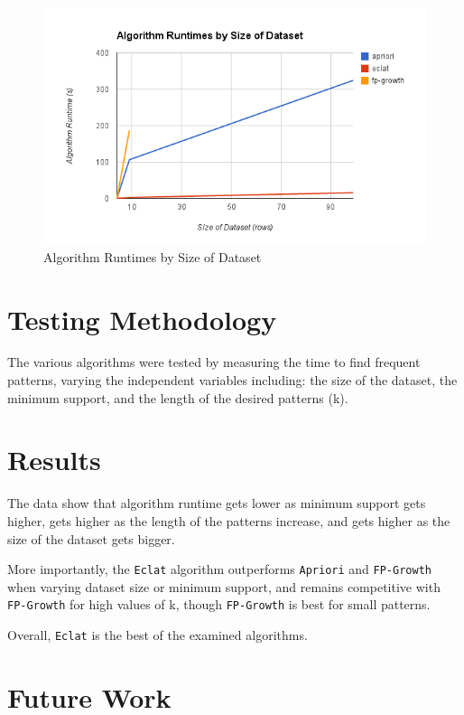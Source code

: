 \documentclass[11pt]{article}
\begin{document}
\begin{multicols}{2}
\begin{center}
\begin{figure}
\includegraphics[scale=0.9]{../figs/runtimes_by_rows.png}
\caption{Algorithm Runtimes by Size of Dataset}
\end{figure}
\end{center}

\section{Testing Methodology}

The various algorithms were tested by measuring the time to find
frequent patterns, varying the independent variables including: the
size of the dataset, the minimum support, and the length of the
desired patterns (k).

\section{Results}
\label{sec:results}

The data show that algorithm runtime gets lower as minimum support gets
higher, gets higher as the length of the patterns increase, and gets
higher as the size of the dataset gets bigger.

More importantly, the \texttt{Eclat} algorithm outperforms
\texttt{Apriori} and \texttt{FP-Growth} when varying dataset size or
minimum support, and remains competitive with \texttt{FP-Growth} for
high values of k, though \texttt{FP-Growth} is best for small
patterns.

Overall, \texttt{Eclat} is the best of the examined algorithms.

\section{Future Work}


\end{multicols}
\end{document}
